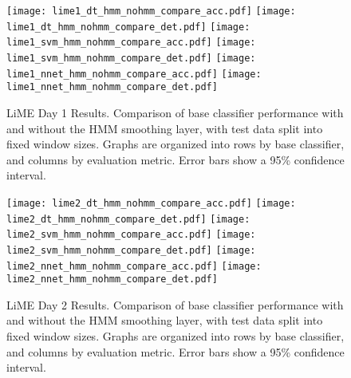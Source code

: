 \begin{figure}[H]
 \centering
 \texttt{[image: lime1\_dt\_hmm\_nohmm\_compare\_acc.pdf]} \hspace{1em}\vspace{1em}
 \texttt{[image: lime1\_dt\_hmm\_nohmm\_compare\_det.pdf]} 
 \texttt{[image: lime1\_svm\_hmm\_nohmm\_compare\_acc.pdf]} \hspace{1em}\vspace{1em}
 \texttt{[image: lime1\_svm\_hmm\_nohmm\_compare\_det.pdf]}
 \texttt{[image: lime1\_nnet\_hmm\_nohmm\_compare\_acc.pdf]} \hspace{1em}
 \texttt{[image: lime1\_nnet\_hmm\_nohmm\_compare\_det.pdf]}
 \caption{LiME Day 1 Results. Comparison of base classifier performance with and without the HMM
  smoothing layer, with test data split into fixed window sizes. Graphs are organized into rows by base
  classifier, and columns by evaluation metric. Error bars show a 95\% confidence interval.}
 \label{fig:lime1_hmm}
\end{figure}

\begin{figure}[H]
 \centering
 \texttt{[image: lime2\_dt\_hmm\_nohmm\_compare\_acc.pdf]} \hspace{1em}\vspace{1em}
 \texttt{[image: lime2\_dt\_hmm\_nohmm\_compare\_det.pdf]} 
 \texttt{[image: lime2\_svm\_hmm\_nohmm\_compare\_acc.pdf]} \hspace{1em}\vspace{1em}
 \texttt{[image: lime2\_svm\_hmm\_nohmm\_compare\_det.pdf]}
 \texttt{[image: lime2\_nnet\_hmm\_nohmm\_compare\_acc.pdf]} \hspace{1em}
 \texttt{[image: lime2\_nnet\_hmm\_nohmm\_compare\_det.pdf]}
 \caption{LiME Day 2 Results. Comparison of base classifier performance with and without the HMM
  smoothing layer, with test data split into fixed window sizes. Graphs are organized into rows by base
  classifier, and columns by evaluation metric. Error bars show a 95\% confidence interval.}
 \label{fig:lime2_hmm}
\end{figure}


